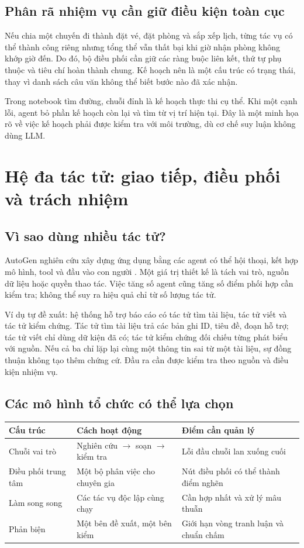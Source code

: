 \subsection{Phân rã nhiệm vụ cần giữ điều kiện toàn cục}
Nếu chia một chuyến đi thành đặt vé, đặt phòng và sắp xếp lịch, từng tác vụ có thể
thành công riêng nhưng tổng thể vẫn thất bại khi giờ nhận phòng không khớp giờ đến.
Do đó, bộ điều phối cần giữ các ràng buộc liên kết, thứ tự phụ thuộc và tiêu chí hoàn
thành chung. Kế hoạch nên là một cấu trúc có trạng thái, thay vì danh sách câu văn
không thể biết bước nào đã xác nhận.

Trong notebook tìm đường, chuỗi đỉnh là kế hoạch thực thi cụ thể. Khi một cạnh lỗi,
agent bỏ phần kế hoạch còn lại và tìm từ vị trí hiện tại. Đây là một minh họa rõ về
việc kế hoạch phải được kiểm tra với môi trường, dù cơ chế suy luận không dùng LLM.

\newpage
\section{Hệ đa tác tử: giao tiếp, điều phối và trách nhiệm}
\subsection{Vì sao dùng nhiều tác tử?}
AutoGen nghiên cứu xây dựng ứng dụng bằng các agent có thể hội thoại, kết hợp mô hình,
tool và đầu vào con người \cite{autogen}. Một giá trị thiết kế là tách vai trò,
nguồn dữ liệu hoặc quyền thao tác. Việc tăng số agent cũng tăng số điểm phối hợp cần
kiểm tra; không thể suy ra hiệu quả chỉ từ số lượng tác tử.

Ví dụ tự đề xuất: hệ thống hỗ trợ báo cáo có tác tử tìm tài liệu, tác tử viết và tác tử
kiểm chứng. Tác tử tìm tài liệu trả các bản ghi ID, tiêu đề, đoạn hỗ trợ; tác tử viết
chỉ dùng dữ kiện đã có; tác tử kiểm chứng đối chiếu từng phát biểu với nguồn. Nếu cả
ba chỉ lặp lại cùng một thông tin sai từ một tài liệu, sự đồng thuận không tạo thêm
chứng cứ. Đầu ra cần được kiểm tra theo nguồn và điều kiện nhiệm vụ.

\subsection{Các mô hình tổ chức có thể lựa chọn}
\begin{center}\small
\begin{tabularx}{\linewidth}{@{}p{2.7cm}XX@{}}\toprule
\textbf{Cấu trúc} & \textbf{Cách hoạt động} & \textbf{Điểm cần quản lý}\\\midrule
Chuỗi vai trò & Nghiên cứu $\to$ soạn $\to$ kiểm tra & Lỗi đầu chuỗi lan xuống cuối\\
Điều phối trung tâm & Một bộ phân việc cho chuyên gia & Nút điều phối có thể thành điểm nghẽn\\
Làm song song & Các tác vụ độc lập cùng chạy & Cần hợp nhất và xử lý mâu thuẫn\\
Phản biện & Một bên đề xuất, một bên kiểm & Giới hạn vòng tranh luận và chuẩn chấm\\\bottomrule
\end{tabularx}\end{center}

